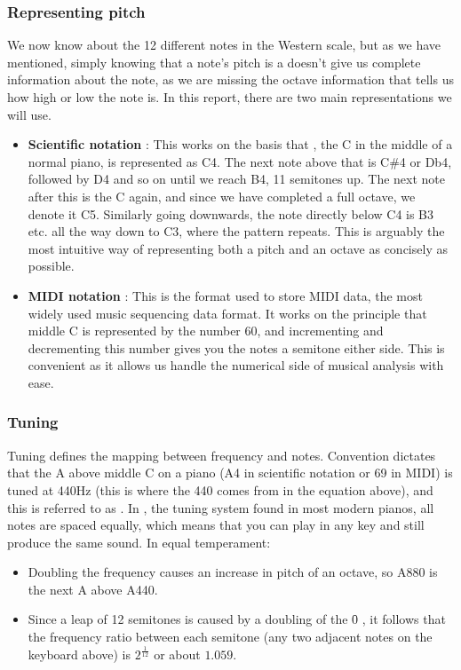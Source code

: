 	\subsubsection{Representing pitch}
	We now know about the 12 different notes in the Western scale, but as we have mentioned, simply knowing that a note's pitch is a  doesn't give us complete information about the note, as we are missing the octave information that tells us how high or low the note is. In this report, there are two main representations we will use.
	\begin{itemize}
		\item \textbf{Scientific notation} : This works on the basis that , the C in the middle of a normal piano, is represented as C4. The next note above that is C\#4 or Db4, followed by D4 and so on until we reach B4, 11 semitones up. The next note after this is the C again, and since we have completed a full octave, we denote it C5. Similarly going downwards, the note directly below C4 is B3 etc. all the way down to C3, where the pattern repeats. This is arguably the most intuitive way of representing both a pitch and an octave as concisely as possible.
		\item \textbf{MIDI notation} :  This is the format used to store MIDI data, the most widely used music sequencing data format. It works on the principle that middle C is represented by the number 60, and incrementing and decrementing this number gives you the notes a semitone either side. This is convenient as it allows us handle the numerical side  of musical analysis with ease.
	\end{itemize}
	
	\subsubsection{Tuning}
	Tuning defines the mapping between frequency and notes. Convention dictates that the A above middle C on a piano (A4 in scientific notation or 69 in MIDI) is tuned at 440Hz (this is where the 440 comes from in the equation above), and this is referred to as . In , the tuning system found in most modern pianos, all notes are spaced equally, which means that you can play in any key and still produce the same sound. In equal temperament:

	\begin{itemize}
		\item Doubling the frequency causes an increase in pitch of an octave, so A880 is the next A above A440.
		\item Since a leap of 12 semitones is caused by a doubling of the \f0 , it follows that the frequency ratio between each semitone (any two adjacent notes on the keyboard above) is \(2^\frac{1}{12}\) or about \(1.059\).
	\end{itemize}
	
